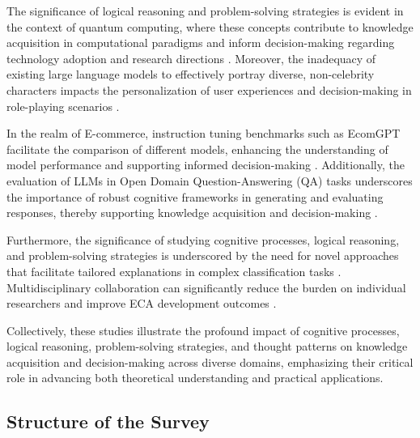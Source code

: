 The significance of logical reasoning and problem-solving strategies is evident in the context of quantum computing, where these concepts contribute to knowledge acquisition in computational paradigms and inform decision-making regarding technology adoption and research directions \cite{gill2024quantumcomputingvisionchallenges}. Moreover, the inadequacy of existing large language models to effectively portray diverse, non-celebrity characters impacts the personalization of user experiences and decision-making in role-playing scenarios \cite{tao2024rolecraftglmadvancingpersonalizedroleplaying}. 



In the realm of E-commerce, instruction tuning benchmarks such as EcomGPT facilitate the comparison of different models, enhancing the understanding of model performance and supporting informed decision-making \cite{li2023ecomgptinstructiontuninglargelanguage}. Additionally, the evaluation of LLMs in Open Domain Question-Answering (QA) tasks underscores the importance of robust cognitive frameworks in generating and evaluating responses, thereby supporting knowledge acquisition and decision-making \cite{oh2024generativeaiparadoxevaluation}. 



Furthermore, the significance of studying cognitive processes, logical reasoning, and problem-solving strategies is underscored by the need for novel approaches that facilitate tailored explanations in complex classification tasks \cite{chiaburu2024copronnconceptbasedprototypicalnearest}. Multidisciplinary collaboration can significantly reduce the burden on individual researchers and improve ECA development outcomes \cite{korre2023takesvillagemultidisciplinaritycollaboration}. 



Collectively, these studies illustrate the profound impact of cognitive processes, logical reasoning, problem-solving strategies, and thought patterns on knowledge acquisition and decision-making across diverse domains, emphasizing their critical role in advancing both theoretical understanding and practical applications.



\subsection{Structure of the Survey} \label{subsec:Structure of the Survey}



